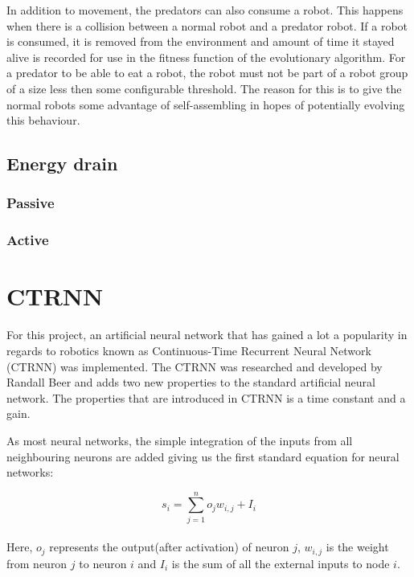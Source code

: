 In addition to movement, the predators can also consume a robot. 
This happens when there is a collision between a normal robot and a predator robot.
If a robot is consumed, it is removed from the environment and amount of time it stayed alive is recorded for use in the fitness function of the evolutionary algorithm. 
For a predator to be able to eat a robot, the robot must not be part of a robot group of a size less then some configurable threshold.
The reason for this is to give the normal robots some advantage of self-assembling in hopes of potentially evolving this behaviour.  



\subsection{Energy drain}
\subsubsection{Passive}
\subsubsection{Active}
\clearpage
\section{CTRNN}
For this project, an artificial neural network that has gained a lot a popularity in regards to robotics known as Continuous-Time Recurrent Neural Network (CTRNN) was implemented. 
The CTRNN was researched and developed by Randall Beer and adds two new properties to the standard artificial neural network. 
The properties that are introduced in CTRNN is a time constant and a gain.

As most neural networks, the simple integration of the inputs from all neighbouring neurons are added giving us the first standard equation for neural networks:

\begin{equation}
	s_i = \sum_{j=1}^{n}o_{j}w_{i,j}+I_i
\end{equation}
\\
Here, $o_j$ represents the output(after activation) of neuron $j$, $w_{i,j}$ is the weight from neuron $j$ to neuron $i$ and $I_i$ is the sum of all the external inputs to node $i$.

